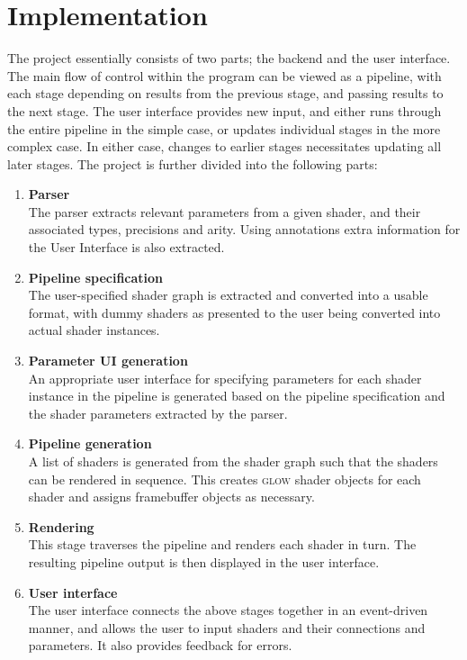 \documentclass[12pt,twoside,notitlepage]{report}
\begin{document}
\cleardoublepage
\chapter{Implementation}
The project essentially consists of two parts; the backend and the user interface. The main flow of control within the program can be viewed as a pipeline, with each stage depending on results from the previous stage, and passing results to the next stage. The user interface provides new input, and either runs through the entire pipeline in the simple case, or updates individual stages in the more complex case. In either case, changes to earlier stages necessitates updating all later stages. The project is further divided into the following parts:

\begin{enumerate}
\item \textbf{Parser}\\
The parser extracts relevant parameters from a given shader, and their associated types, precisions and arity. Using annotations extra information for the User Interface is also extracted.
\item \textbf{Pipeline specification}\\
The user-specified shader graph is extracted and converted into a usable format, with dummy shaders as presented to the user being converted into actual shader instances.
\item \textbf{Parameter UI generation}\\
An appropriate user interface for specifying parameters for each shader instance in the pipeline is generated based on the pipeline specification and the shader parameters extracted by the parser.
\item \textbf{Pipeline generation}\\
A list of shaders is generated from the shader graph such that the shaders can be rendered in sequence. This creates \textsc{glow} shader objects for each shader and assigns framebuffer objects as necessary.
\item \textbf{Rendering}\\
This stage traverses the pipeline and renders each shader in turn. The resulting pipeline output is then displayed in the user interface.
\item \textbf{User interface}\\
The user interface connects the above stages together in an event-driven manner, and allows the user to input shaders and their connections and parameters. It also provides feedback for errors.
\end{enumerate}
\end{document}

